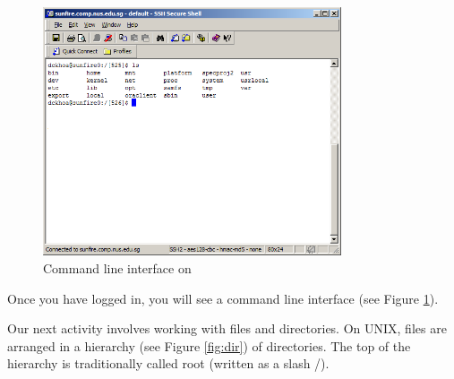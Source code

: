 



\begin{frame}
\begin{figure}
\begin{center}
\includegraphics[width=250pt]{ssh_command_line}
\caption{Command line interface on }
\label{fig:cli}
\end{center}
\end{figure}
\end{frame}

Once you have logged in, you will see a command line interface (see Figure
\ref{fig:cli}). 

Our next activity involves working with files and directories. On UNIX, files
are arranged in a hierarchy (see Figure \ref{fig:dir}) of directories.  The top
of the hierarchy is traditionally called root (written as a slash /).

